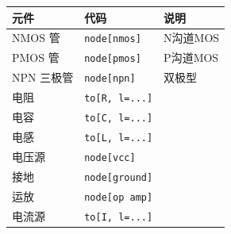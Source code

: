 \documentclass[a4paper, 12pt]{article}
\begin{document}
\begin{tabular}{lll}
\hline
元件 & 代码 & 说明 \\
\hline
NMOS 管 & \texttt{node[nmos]} & N沟道MOS \\
PMOS 管 & \texttt{node[pmos]} & P沟道MOS \\
NPN 三极管 & \texttt{node[npn]} & 双极型 \\
电阻 & \texttt{to[R, l=...]} & \\
电容 & \texttt{to[C, l=...]} & \\
电感 & \texttt{to[L, l=...]} & \\
电压源 & \texttt{node[vcc]} & \\
接地 & \texttt{node[ground]} & \\
运放 & \texttt{node[op amp]} & \\
电流源 & \texttt{to[I, l=...]} & \\
\hline
\end{tabular}
\end{document}
